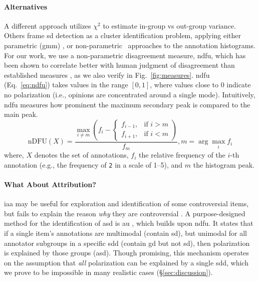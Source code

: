 \documentclass[manuscript,screen,review,anonymous]{acmart}
\theoremstyle{acmplain}
\theoremstyle{researchquestionstyle}
\begin{document}
\paragraph{Alternatives} A different approach \citep{akhtar_2019} utilizes $\chi^2$ to estimate in-group vs out-group variance. Others frame \ac{sd} detection as a cluster identification problem, applying either parametric (\ac{gmm}) \citep{checco_2017}, or non-parametric~\citep{pavlopoulos-likas-2024, Mignemi2024} approaches to the annotation histograms. For our work, we use a non-parametric disagreement measure, \ac{ndfu}, which has been shown to correlate better with human judgment of disagreement than established measures \citep{pavlopoulos-likas-2024}, as we also verify in Fig.~\ref{fig:measures}. \ac{ndfu} (Eq.~\ref{eq:ndfu}) takes values in the range $[0,1]$, where values close to $0$ indicate no polarization (i.e., opinions are concentrated around a single mode). Intuitively, \ac{ndfu} measures how prominent the maximum secondary peak is compared to the main peak. 
\begin{equation}
	\label{eq:ndfu}
	\mathrm{nDFU}(X) =
	\frac{
		\max_{i \neq m}
		\left(	
		f_i -
		\begin{cases}
			f_{i-1}, & \text{if } i > m \\
			f_{i+1}, & \text{if } i < m
		\end{cases}
		\right)
	}{f_m},
	m = \arg\max_i f_i
\end{equation}
\noindent where, $X$ denotes the set of annotations, $f_i$ the relative frequency of the $i$-th annotation (e.g., the frequency of \texttt{2} in a scale of 1--5), and $m$ the histogram peak.

\paragraph{What About Attribution?} \ac{iaa} may be useful for exploration and identification of some controversial items, but fails to explain the reason \emph{why} they are controversial \citep{abercrombie-etal-2025-consistency, vitsakis-etal-2023-ilab}. A purpose-designed method for the identification of \ac{asd} is \ac{au} \citep{pavlopoulos-likas-2024}, which builds upon \ac{ndfu}. It states that if a single item's annotations are multimodal (contain \ac{sd}), but unimodal for all annotator subgroups in a specific \ac{sdd} (contain \ac{gd} but not \ac{sd}), then polarization is explained by those groups (\ac{asd}). Though promising, this mechanism operates on the assumption that \emph{all} polarization can be explained by a single \ac{sdd}, which we prove to be impossible in many realistic cases (\S\ref{sec:discussion}).
\end{document}
